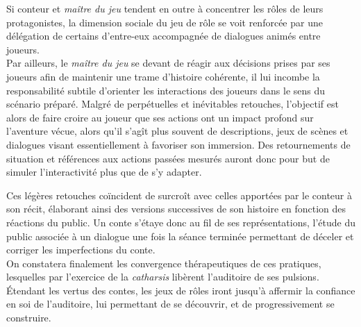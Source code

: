 Si conteur et \textit{maître du jeu} tendent en outre à concentrer les rôles de leurs protagonistes, la dimension sociale du jeu de rôle se voit renforcée par une délégation de certains d'entre-eux accompagnée de dialogues animés entre joueurs.\\


Par ailleurs, le \textit{maître du jeu} se devant de réagir aux décisions prises par ses joueurs afin de maintenir une trame d'histoire cohérente, il lui incombe la responsabilité subtile d'orienter les interactions des joueurs dans le sens du scénario préparé. Malgré de perpétuelles et inévitables retouches, l'objectif est alors de faire croire au joueur que ses actions ont un impact profond sur l'aventure vécue, alors qu'il s'agît plus souvent de descriptions, jeux de scènes et dialogues visant essentiellement à favoriser son immersion. Des retournements de situation et références aux actions passées mesurés auront donc pour but de simuler l'interactivité plus que de s'y adapter.

Ces légères retouches coïncident de surcroît avec celles apportées par le conteur à son récit, élaborant ainsi des versions successives de son histoire en fonction des réactions du public. Un conte s'étaye donc au fil de ses représentations, l'étude du public associée à un dialogue une fois la séance terminée permettant de déceler et corriger les imperfections du conte.\\


On constatera finalement les convergence thérapeutiques de ces pratiques, lesquelles par l'exercice de la \textit{catharsis} libèrent l'auditoire de ses pulsions. Étendant les vertus des contes, les jeux de rôles iront jusqu'à affermir la confiance en soi de l'auditoire, lui permettant de se découvrir, et de progressivement se construire.

\clearpage
